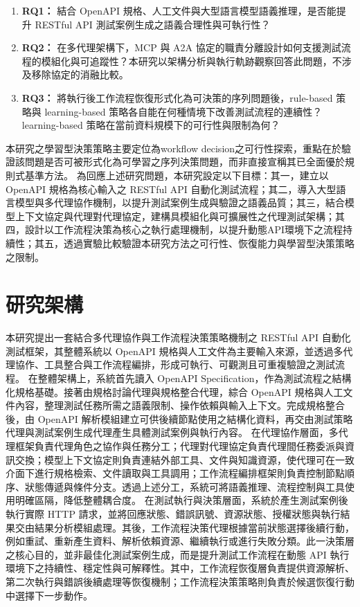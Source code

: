 \begin{ZhChapter}
\begin{enumerate}
    \item \textbf{RQ1：} 結合 OpenAPI 規格、人工文件與大型語言模型語義推理，是否能提升 RESTful API 測試案例生成之語義合理性與可執行性？
    \item \textbf{RQ2：} 在多代理架構下，MCP 與 A2A 協定的職責分離設計如何支援測試流程的模組化與可追蹤性？本研究以架構分析與執行軌跡觀察回答此問題，不涉及移除協定的消融比較。
    \item \textbf{RQ3：} 將執行後工作流程恢復形式化為可決策的序列問題後，rule-based 策略與 learning-based 策略各自能在何種情境下改善測試流程的連續性？learning-based 策略在當前資料規模下的可行性與限制為何？
\end{enumerate}

\text 本研究之學習型決策策略主要定位為workflow decision之可行性探索，重點在於驗證該問題是否可被形式化為可學習之序列決策問題，而非直接宣稱其已全面優於規則式基準方法。
\text 為回應上述研究問題，本研究設定以下目標：其一，建立以 OpenAPI 規格為核心輸入之 RESTful API 自動化測試流程；其二，導入大型語言模型與多代理協作機制，以提升測試案例生成與驗證之語義品質；其三，結合模型上下文協定與代理對代理協定，建構具模組化與可擴展性之代理測試架構；其四，設計以工作流程決策為核心之執行處理機制，以提升動態API環境下之流程持續性；其五，透過實驗比較驗證本研究方法之可行性、恢復能力與學習型決策策略之限制。

\section{研究架構}
\text 本研究提出一套結合多代理協作與工作流程決策策略機制之 RESTful API 自動化測試框架，其整體系統以 OpenAPI 規格與人工文件為主要輸入來源，並透過多代理協作、工具整合與工作流程編排，形成可執行、可觀測且可重複驗證之測試流程。
\text 在整體架構上，系統首先讀入 OpenAPI Specification，作為測試流程之結構化規格基礎。接著由規格討論代理與規格整合代理，綜合 OpenAPI 規格與人工文件內容，整理測試任務所需之語義限制、操作依賴與輸入上下文。完成規格整合後，由 OpenAPI 解析模組建立可供後續節點使用之結構化資料，再交由測試策略代理與測試案例生成代理產生具體測試案例與執行內容。
\text 在代理協作層面，多代理框架負責代理角色之協作與任務分工；代理對代理協定負責代理間任務委派與資訊交換；模型上下文協定則負責連結外部工具、文件與知識資源，使代理可在一致介面下進行規格檢索、文件讀取與工具調用；工作流程編排框架則負責控制節點順序、狀態傳遞與條件分支。透過上述分工，系統可將語義推理、流程控制與工具使用明確區隔，降低整體耦合度。
\text 在測試執行與決策層面，系統於產生測試案例後執行實際 HTTP 請求，並將回應狀態、錯誤訊號、資源狀態、授權狀態與執行結果交由結果分析模組處理。其後，工作流程決策代理根據當前狀態選擇後續行動，例如重試、重新產生資料、解析依賴資源、繼續執行或進行失敗分類。此一決策層之核心目的，並非最佳化測試案例生成，而是提升測試工作流程在動態 API 執行環境下之持續性、穩定性與可解釋性。其中，工作流程恢復層負責提供資源解析、第二次執行與錯誤後續處理等恢復機制；工作流程決策策略則負責於候選恢復行動中選擇下一步動作。


\end{ZhChapter}
